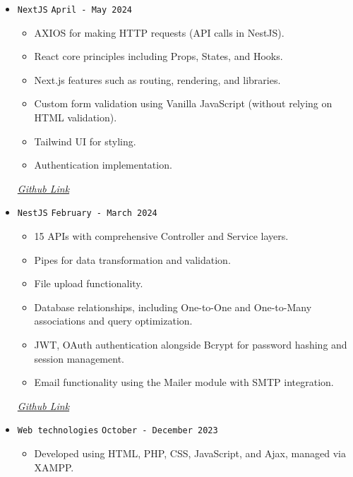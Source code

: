 \documentclass[a4paper,12pt]{article}
\begin{document}
\begin{itemize}
    \item \texttt{NextJS} \hfill \texttt{April - May 2024}  
    \begin{itemize}[label=--]
        \item AXIOS for making HTTP requests (API calls in NestJS).
        \item React core principles including Props, States, and Hooks.
        \item Next.js features such as routing, rendering, and libraries.
        \item Custom form validation using Vanilla JavaScript (without relying on HTML validation).
        \item Tailwind UI for styling.
        \item Authentication implementation.
    \end{itemize}

    \hfill \href{https://github.com/0Sa-ad0/advanced-web-tech/tree/main/NextJS}{\textit{Github Link}} 
    \vspace{0.3cm}

    \item \texttt{NestJS} \hfill \texttt{February - March 2024}  
    \begin{itemize}[label=--]
        \item 15 APIs with comprehensive Controller and Service layers.
        \item Pipes for data transformation and validation.
        \item File upload functionality.
        \item Database relationships, including One-to-One and One-to-Many associations and query optimization.
        \item JWT, OAuth authentication alongside Bcrypt for password hashing and session management.
        \item Email functionality using the Mailer module with SMTP integration.
    \end{itemize} 

    \hfill \href{https://github.com/0Sa-ad0/advanced-web-tech/tree/main/NestJS}{\textit{Github Link}}  
    \vspace{0.3cm}

    \item \texttt{Web technologies} \hfill \texttt{October - December 2023}  
    \begin{itemize}[label=--]
        \item Developed using HTML, PHP, CSS, JavaScript, and Ajax, managed via XAMPP.
        

\end{itemize}
\end{itemize}
\end{document}
